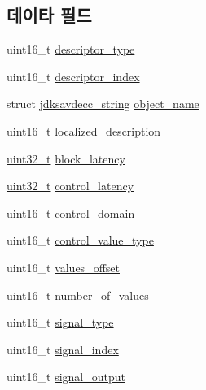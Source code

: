 \subsection*{데이타 필드}
\begin{DoxyCompactItemize}
\item 
uint16\+\_\+t \hyperlink{structjdksavdecc__descriptor__signal__transcoder_ab7c32b6c7131c13d4ea3b7ee2f09b78d}{descriptor\+\_\+type}
\item 
uint16\+\_\+t \hyperlink{structjdksavdecc__descriptor__signal__transcoder_a042bbc76d835b82d27c1932431ee38d4}{descriptor\+\_\+index}
\item 
struct \hyperlink{structjdksavdecc__string}{jdksavdecc\+\_\+string} \hyperlink{structjdksavdecc__descriptor__signal__transcoder_a7d1f5945a13863b1762fc6db74fa8f80}{object\+\_\+name}
\item 
uint16\+\_\+t \hyperlink{structjdksavdecc__descriptor__signal__transcoder_a0926f846ca65a83ad5bb06b4aff8f408}{localized\+\_\+description}
\item 
\hyperlink{parse_8c_a6eb1e68cc391dd753bc8ce896dbb8315}{uint32\+\_\+t} \hyperlink{structjdksavdecc__descriptor__signal__transcoder_ae2e9f0088d5e900b610d1b2818dfc559}{block\+\_\+latency}
\item 
\hyperlink{parse_8c_a6eb1e68cc391dd753bc8ce896dbb8315}{uint32\+\_\+t} \hyperlink{structjdksavdecc__descriptor__signal__transcoder_ab2bd4639caaf9a8078b68368afbd63b6}{control\+\_\+latency}
\item 
uint16\+\_\+t \hyperlink{structjdksavdecc__descriptor__signal__transcoder_a8937b22996b7c28ae209f29fe777f03a}{control\+\_\+domain}
\item 
uint16\+\_\+t \hyperlink{structjdksavdecc__descriptor__signal__transcoder_a62a5b88a920cc4d09508de6fc60d9a63}{control\+\_\+value\+\_\+type}
\item 
uint16\+\_\+t \hyperlink{structjdksavdecc__descriptor__signal__transcoder_a2987071ee0b81f35817e48a0dc92ad76}{values\+\_\+offset}
\item 
uint16\+\_\+t \hyperlink{structjdksavdecc__descriptor__signal__transcoder_a1c32421ead62b8a032c4346688cd9b69}{number\+\_\+of\+\_\+values}
\item 
uint16\+\_\+t \hyperlink{structjdksavdecc__descriptor__signal__transcoder_a248e60ef99d5ed1779989d1dd6b6dc5a}{signal\+\_\+type}
\item 
uint16\+\_\+t \hyperlink{structjdksavdecc__descriptor__signal__transcoder_ae2e81a95ee9ad83f1fe22b6a1ee29075}{signal\+\_\+index}
\item 
uint16\+\_\+t \hyperlink{structjdksavdecc__descriptor__signal__transcoder_ab4b91864e6fc335d7e86536d9f4461e4}{signal\+\_\+output}
\end{DoxyCompactItemize}


